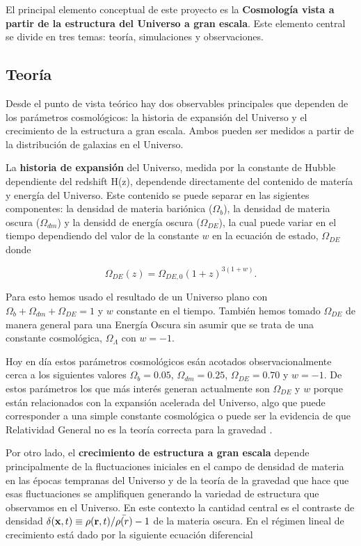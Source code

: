 \documentclass[spanish,notitlepage,letterpaper,11pt]{article} %
\begin{document}
El principal elemento conceptual de este proyecto es la {\bf Cosmolog\'ia
vista a partir de la estructura del Universo a gran escala}. Este
elemento central se divide en tres temas: teor\'ia,
simulaciones y observaciones.

\subsection{Teor\'ia}

Desde el punto de vista te\'orico hay dos observables principales que
dependen de los par\'ametros cosmol\'ogicos: la historia de
expansi\'on del Universo y el crecimiento de la estructura a gran
escala. Ambos pueden ser medidos a partir de la distribuci\'on de
galaxias en el Universo.

La {\bf historia de expansi\'on} del Universo, medida por la constante
de Hubble dependiente del redshift H(z), dependende directamente del
contenido de mater\'ia y energ\'ia del Universo. Este contenido se 
puede separar en las sigientes componentes: la densidad de materia
bari\'onica ($\Omega_b$), la densidad de materia oscura
($\Omega_{dm}$) y la densidd de energ\'ia  oscura  ($\Omega_{DE}$), la
cual puede variar en el tiempo dependiendo del valor de la constante
$w$ en la ecuaci\'on de estado, $\Omega_{DE}$ donde 

\begin{equation}
\Omega_{DE}(z) = \Omega_{DE,0}(1+z)^{3(1+w)}.
\end{equation}

Para esto hemos usado el resultado de un Universo plano con
$\Omega_b+\Omega_{dm}+\Omega_{DE}=1$ y $w$ constante en el tiempo.
Tambi\'en hemos tomado $\Omega_{DE}$ de manera general para una
Energ\'ia Oscura sin asumir que se trata de una constante
cosmol\'ogica, $\Omega_\Lambda$ con $w=-1$. 

Hoy en d\'ia estos par\'ametros cosmol\'ogicos es\'an
acotados observacionalmente cerca a los siguientes valores $\Omega_b=0.05$,
$\Omega_{dm}=0.25$, $\Omega_{DE}=0.70$ y $w=-1$. De estos
par\'ametros los que m\'as inter\'es generan actualmente son
$\Omega_{DE}$ y $w$ porque est\'an relacionados con  la expansi\'on
acelerada del Universo, algo que puede corresponder a una simple constante
cosmol\'ogica o puede ser la evidencia de que Relatividad General no
es la teor\'ia correcta para la gravedad 
\cite{2014arXiv1401.0046M}.

Por otro lado, el {\bf crecimiento de estructura a gran escala} depende
principalmente de la fluctuaciones iniciales en el campo de densidad
de materia en las \'epocas tempranas del Universo y de la teor\'ia de
la gravedad que hace que esas fluctuaciones se amplifiquen generando
la variedad de estructura que observamos en el Universo. En este
contexto la cantidad central es el contraste de densidad $\delta({\bf
  x},t)\equiv\rho({\bf r},t)/\bar{\rho(r)}-1$ de la materia oscura. En
el r\'egimen lineal de crecimiento est\'a dado por la siguiente
ecuaci\'on diferencial 
\end{document}
